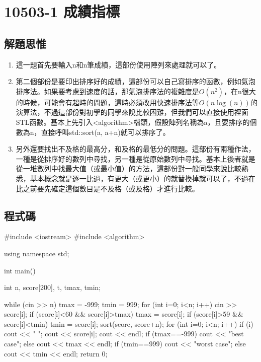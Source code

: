 \section{10503-1 成績指標}

\subsection{解題思惟}
\begin{enumerate}
	\item 這一題首先要輸入n和n筆成績，這部份使用陣列來處理就可以了。
	\item 第二個部份是要印出排序好的成績，這部份可以自己寫排序的函數，例如氣泡排序法。如果要考慮到速度的話，那氣泡排序法的複雜度是$O(n^2)$，在n很大的時候，可能會有超時的問題，這時必須改用快速排序法等$O(n\log(n))$的演算法，不過這部份對初學的同學來說比較困難，但我們可以直接使用\cc{}裡面STL函數。基本上先引入<algorithm>檔頭，假設陣列名稱為a，且要排序的個數為n，直接呼叫std::sort(a, a+n)就可以排序了。
	\item 另外還要找出不及格的最高分，和及格的最低分的問題。這部份有兩種作法，一種是從排序好的數列中尋找，另一種是從原始數列中尋找。基本上後者就是從一堆數列中找最大值（或最小值）的方法，這部份對一般同學來說比較熟悉，基本概念就是逐一比過，有更大（或更小）的就替換掉就可以了，不過在比之前要先確定這個數目是不及格（或及格）才進行比較。
\end{enumerate}

\subsection{程式碼}
\begin{cppcode}
#include <iostream>
#include <algorithm>

using namespace std;

int main()
{
	int n, score[200], t, tmax, tmin;
	
	while (cin >> n) {
		tmax = -999;
		tmin = 999;
		for (int i=0; i<n; i++) {
			cin >> score[i];
			if (score[i]<60 && score[i]>tmax) tmax = score[i];
			if (score[i]>59 && score[i]<tmin) tmin = score[i];
		}
		sort(score, score+n);
		for (int i=0; i<n; i++) {
			if (i) cout << " ";
			cout << score[i];
		}
		cout << endl;
		if (tmax==-999) cout << "best case\n";
		else cout << tmax << endl;
		if (tmin==999) cout << "worst case\n";
		else cout << tmin << endl;
	}
	return 0;
}
\end{cppcode}